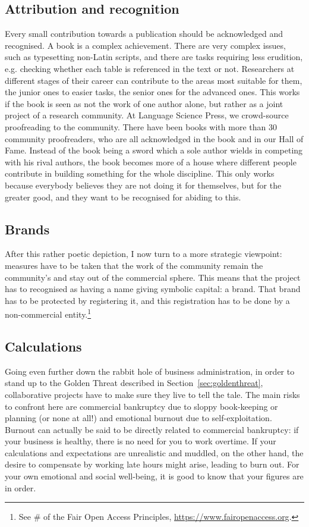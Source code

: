 \documentclass[12pt]{article}
\begin{document}
\subsection{Attribution and recognition}
Every small contribution towards a publication should be acknowledged and recognised. A book is a complex achievement. There are very complex issues, such as typesetting non-Latin scripts, and there are tasks requiring less erudition, e.g. checking whether each table is referenced in the text or not. Researchers at different stages of their career can contribute to the areas most suitable for them, the junior ones to easier tasks, the senior ones for the advanced ones. This works if the book is seen as not the work of one author alone, but rather as a joint project of a research community. At Language Science Press, we crowd-source proofreading to the community. There have been books with more than 30 community proofreaders, who are all acknowledged in the book and in our Hall of Fame. Instead of the book being a sword which a sole author wields in competing with his rival authors, the book becomes more of a house where different people contribute in building something for the whole discipline. This only works because everybody believes they are not doing it for themselves, but for the greater good, and they want to be recognised for abiding to this. 

\subsection{Brands}
After this rather poetic depiction, I now turn to a more strategic viewpoint: measures have to be taken that the work of the community remain the community's and stay out of the commercial sphere. This means that the project has to recognised as having a name giving symbolic capital: a brand. That brand has to be protected by registering it, and this registration has to be done by a non-commercial entity.\footnote{See \# of the Fair Open Access Principles, \url{https://www.fairopenaccess.org}.}


\subsection{Calculations}
Going even further down the rabbit hole of business administration, in order to stand up to the Golden Threat described in Section~\ref{sec:goldenthreat}, collaborative projects have to make sure they live to tell the tale. The main risks to confront here are commercial bankruptcy due to sloppy book-keeping or planning (or none at all!) and emotional burnout due to self-exploitation. Burnout can actually be said to be directly related to commercial bankruptcy: if your business is healthy, there is no need for you to work overtime. If your calculations and expectations are unrealistic and muddled, on the other hand, the desire to compensate by working late hours might arise, leading to burn out. For your own emotional and social well-being, it is good to know that your figures are in order. 
\end{document}
